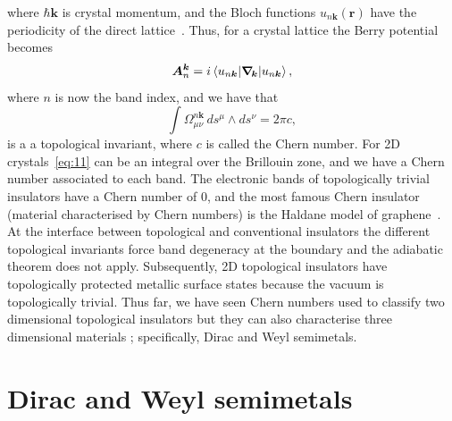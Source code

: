 \documentclass[11pt, a4paper]{article}
\begin{document}
where $\hbar\bm{k}$ is crystal momentum, and the Bloch functions
$u_{n\bm{k}}(\bm{r})$ have the periodicity of the direct lattice~\cite{Bloch}.
Thus, for a crystal lattice the Berry potential becomes 
\begin{equation}
  \bm{A}_{n}^{\bm{k}} =  i\braket{u_{n\bm{k}} |\bm{\nabla_{\! k}}| u_{n\bm{k}}},
\end{equation}
where $n$ is now the band index, and we have that
\begin{equation}\label{eq:11}
  \int{\Omega^{n \bm{k}}_{\mu\nu}\,ds^\mu\wedge ds^\nu} = 2\pi c,
\end{equation}
is a  a topological invariant, where $c$ is called the Chern number.
For 2D crystals~\eqref{eq:11} can be an integral over the Brillouin zone, 
and we have a Chern number associated to each band.
The electronic bands of topologically trivial insulators have a Chern number of 0,
and the most famous Chern insulator (material characterised by Chern numbers)
is the Haldane model of graphene~\cite{Haldane}.
At the interface between topological and conventional insulators the different 
topological invariants force band degeneracy at the boundary and the adiabatic theorem does not
apply. Subsequently, 2D topological insulators have topologically protected metallic 
surface states because the vacuum is topologically trivial.
Thus far, we have seen Chern numbers used to classify two dimensional 
topological insulators but they can also characterise three dimensional materials
; specifically, Dirac and Weyl semimetals.
\section{Dirac and Weyl semimetals}
\end{document}
